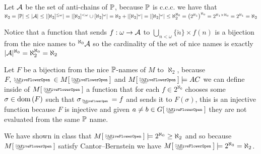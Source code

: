 \begin{cExercise}
\begin{cPart}
		Let $\cal A$ be the set of anti-chains of $\P$, because $\P$ is c.c.c. we have that $\aleph_2=|\P|\le|\cal A|\le |[\aleph_2]^{\le \omega}|=|[\aleph_2]^{< \omega}\cup [\aleph_2]^{\omega}|=\aleph_2+|[\aleph_2]^{\omega}|=|[\aleph_2]^{\omega}|\le \aleph_2^{\aleph_0}=\left(2^{\aleph_1}\right)^{\aleph_0}=2^{\aleph_1\times\aleph_0}=2^{\aleph_1}=\aleph_2$
		
		Notice that a function that sends $f:\omega\to\cal A$ to $\bigcup_{n<\omega}\{\check{n}\}\times f(n)$ is a bijection from the nice names to $^{\aleph_0}\cal A$ so the cardinality of the set of nice names is exactly $|\cal A|^{\aleph_0}=\aleph_2^{\aleph_0}=\aleph_2$
	\end{cPart}
	\begin{cPart}
		Let $F$ be a bijection from the nice $\P$-names of $M$ to $\aleph_2$, because $F,\flower\in M[\flower]$ and $M[\flower]\models AC$ we can define inside of $M[\flower]$ a function that for each $f\in 2^{\aleph_0}$ chooses some $\sigma\in\dom{F}$ such that $\sigma_\flower=f$ and sends it to $F(\sigma)$, this is an injective function because $F$ is injective and given $a\ne b\in G[\flower]$ they are not evaluated from the same $\P$ name.
			
		We have shown in class that $M[\flower]\models 2^{\aleph_0}\ge\aleph_2$ and so because $M[\flower]$ satisfy Cantor–Bernstein we have $M[\flower]\models 2^{\aleph_0}=\aleph_2$.
	\end{cPart}
\end{cExercise}
